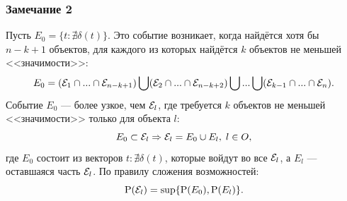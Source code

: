 \subsubsection*{Замечание 2}
Пусть $E_0 = \{t: \nexists \delta(t)\}$. Это событие возникает, когда найдётся хотя бы $n-k+1$ объектов, для каждого из которых найдётся $k$ объектов не меньшей <<значимости>>:
\begin{equation*}
 E_0 = (\mathcal{E}_1 \cap ... \cap \mathcal{E}_{n-k+1}) \bigcup (\mathcal{E}_2 \cap ... \cap \mathcal{E}_{n-k+2}) \bigcup ... \bigcup (\mathcal{E}_{k-1} \cap ... \cap \mathcal{E}_{n}).
\end{equation*}
Событие $E_0$ --- более узкое, чем $\mathcal{E}_l$, где требуется $k$ объектов не меньшей <<значимости>> только для объекта $l$:
\begin{equation*}
 E_0 \subset \mathcal{E}_l \Rightarrow \mathcal{E}_l = E_0 \cup E_l,\;l \in O,
\end{equation*}
где $E_0$ состоит из векторов $t: \nexists \delta(t)$, которые войдут во все $\mathcal{E}_l$, а 
$E_l$ --- оставшаяся часть $\mathcal{E}_l$. По правилу сложения возможностей:
\begin{equation*}
 {\mathrm{P}}(\mathcal{E}_l) = \sup\{{\mathrm{P}}(E_0), {\mathrm{P}}(E_l)\}.
\end{equation*}
